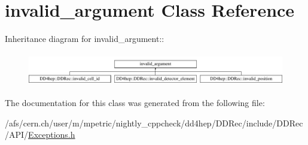 \hypertarget{classstd_1_1invalid__argument}{
\section{invalid\_\-argument Class Reference}
\label{classstd_1_1invalid__argument}
}
Inheritance diagram for invalid\_\-argument::\begin{figure}[H]
\begin{center}
\leavevmode
\includegraphics[height=1.44703cm]{classstd_1_1invalid__argument}
\end{center}
\end{figure}


The documentation for this class was generated from the following file:\begin{DoxyCompactItemize}
\item 
/afs/cern.ch/user/m/mpetric/nightly\_\-cppcheck/dd4hep/DDRec/include/DDRec/API/\hyperlink{_d_d_rec_2include_2_d_d_rec_2_a_p_i_2_exceptions_8h}{Exceptions.h}\end{DoxyCompactItemize}
